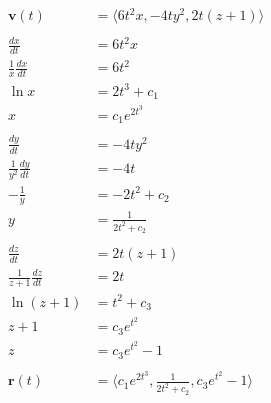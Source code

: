 \documentclass{article}
\begin{document}
\setcounter{subsubsection}{26}
\subsubsection{}

\begin{align*}
  \mathbf{v}(t)                   & = \langle 6 t^2 x, -4 t y^2, 2 t (z + 1) \rangle                        \\ \\
  \frac{d x}{d t}                 & = 6 t^2 x                                                               \\
  \frac{1}{x} \frac{d x}{d t}     & = 6 t^2                                                                 \\
  \ln x                           & = 2 t^3 + c_1                                                           \\
  x                               & = c_1 e^{2 t^3}                                                         \\ \\
  \frac{d y}{d t}                 & = -4 t y^2                                                              \\
  \frac{1}{y^2} \frac{d y}{d t}   & = -4 t                                                                  \\
  -\frac{1}{y}                    & = -2 t^2 + c_2                                                          \\
  y                               & = \frac{1}{2 t^2 + c_2}                                                 \\ \\
  \frac{d z}{d t}                 & = 2 t (z + 1)                                                           \\
  \frac{1}{z + 1} \frac{d z}{d t} & = 2 t                                                                   \\
  \ln (z + 1)                     & = t^2 + c_3                                                             \\
  z + 1                           & = c_3 e^{t^2}                                                           \\
  z                               & = c_3 e^{t^2} - 1                                                       \\ \\
  \mathbf{r}(t)                   & = \langle c_1 e^{2 t^3}, \frac{1}{2 t^2 + c_2}, c_3 e^{t^2} - 1 \rangle
\end{align*}
\end{document}

